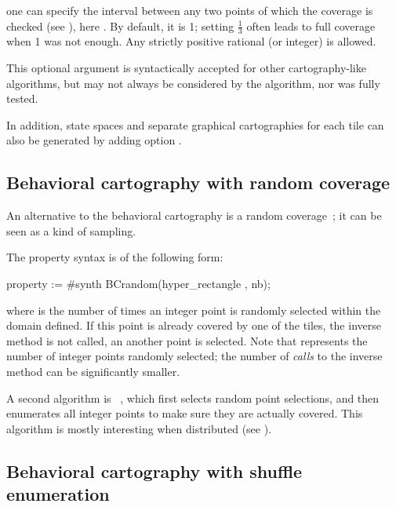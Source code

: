 \noindent one can specify the interval between any two points of which the coverage is checked (see \cite{AF10}), here .
By default, it is 1; setting $\frac{1}{3}$ often leads to full coverage when 1 was not enough.
Any strictly positive rational (or integer) is allowed.

\begin{becareful}
	This optional argument is syntactically accepted for other cartography-like algorithms, but may not always be considered by the algorithm, nor was fully tested.
\end{becareful}

In addition, state spaces and separate graphical cartographies for each tile can also be generated by adding option .


\subsection*{Behavioral cartography with random coverage}\label{section:algorithm:BC:random}

An alternative to the behavioral cartography is a random coverage~\cite{AF10}; it can be seen as a kind of sampling.

The property syntax is of the following form:

\begin{IMITATORproperty}
property := #synth BCrandom(hyper_rectangle , nb);
\end{IMITATORproperty}


\noindent{}where  is the number of times an integer point is randomly selected within the domain defined.
If this point is already covered by one of the tiles, the inverse method is not called, an another point is selected.
Note that  represents the number of integer points randomly selected; the number of \emph{calls} to the inverse method can be significantly smaller.

A second algorithm is ~\cite{ACE14}, which first selects random point selections, and then enumerates all integer points to make sure they are actually covered.
This algorithm is mostly interesting when distributed (see \cite{ACE14,ACN15}).


\subsection*{Behavioral cartography with shuffle enumeration}\label{section:algorithm:BC:shuffle}

